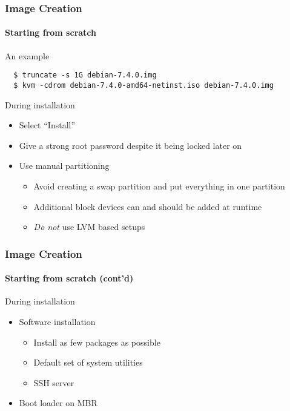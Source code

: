 \begin{frame}[fragile]
\frametitle{Image Creation}
\framesubtitle{Starting from scratch}
An example
\begin{lstlisting}
  $ truncate -s 1G debian-7.4.0.img
  $ kvm -cdrom debian-7.4.0-amd64-netinst.iso debian-7.4.0.img
\end{lstlisting}
During installation
\begin{itemize}
\item Select ``Install''
\item Give a strong root password despite it being locked later on
\item Use manual partitioning
  \begin{itemize}
  \item Avoid creating a swap partition and put everything in one partition
  \item Additional block devices can and should be added at runtime
  \item \emph{Do not} use LVM based setups
  \end{itemize}
\end{itemize}
\end{frame}

\begin{frame}
\frametitle{Image Creation}
\framesubtitle{Starting from scratch (cont'd)}
During installation
\begin{itemize}
\item Software installation
  \begin{itemize}
  \item Install as few packages as possible
  \item Default set of system utilities
  \item SSH server
  \end{itemize}
\item Boot loader on MBR
\end{itemize}
\end{frame}



